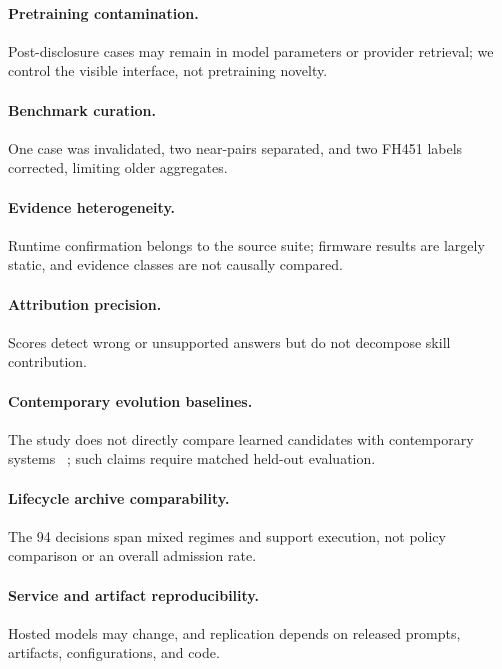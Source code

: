 \documentclass[11pt]{article}
\begin{document}
\paragraph{Pretraining contamination.}
Post-disclosure cases may remain in model parameters or provider retrieval; we control
the visible interface, not pretraining novelty.

\paragraph{Benchmark curation.}
One case was invalidated, two near-pairs separated, and two FH451 labels corrected,
limiting older aggregates.

\paragraph{Evidence heterogeneity.}
Runtime confirmation belongs to the source suite; firmware results are largely static,
and evidence classes are not causally compared.

\paragraph{Attribution precision.}
Scores detect wrong or unsupported answers but do not decompose skill contribution.

\paragraph{Contemporary evolution baselines.}
The study does not directly compare learned candidates with contemporary systems
~\cite{asi,mindskill,skillcommit,coevoskills,trace2skilleda,skillforge,evohunt}; such
claims require matched held-out evaluation.

\paragraph{Lifecycle archive comparability.}
The 94 decisions span mixed regimes and support execution, not policy comparison or an
overall admission rate.

\paragraph{Service and artifact reproducibility.}
Hosted models may change, and replication depends on released prompts, artifacts,
configurations, and code.
\end{document}
